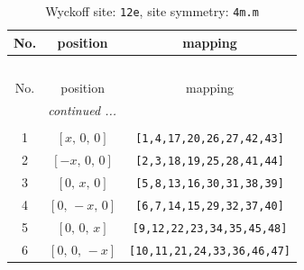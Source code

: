 \documentclass[fleqn,8pt]{jsarticle}
\begin{document}
\renewcommand{\arraystretch}{1.2}
\begin{longtable}{ccc}
\caption{Wyckoff site: {\tt 12e}, site symmetry: {\tt 4m.m}}
 \\
 \hline \hline
No. & position & mapping \\ \hline \endfirsthead

\multicolumn{2}{l}{\tablename\ \thetable{}} \\
 \hline \hline
No. & position & mapping \\ \hline \endhead

 \hline \hline
\multicolumn{2}{r}{\footnotesize\it continued ...} \\ \endfoot

 \hline \hline
\multicolumn{2}{r}{} \\ \endlastfoot

1 & $\left[ x,\, 0,\, 0 \right]$ & {\tt [1,4,17,20,26,27,42,43]} \\ \hline
2 & $\left[ - x,\, 0,\, 0 \right]$ & {\tt [2,3,18,19,25,28,41,44]} \\ \hline
3 & $\left[ 0,\, x,\, 0 \right]$ & {\tt [5,8,13,16,30,31,38,39]} \\ \hline
4 & $\left[ 0,\, - x,\, 0 \right]$ & {\tt [6,7,14,15,29,32,37,40]} \\ \hline
5 & $\left[ 0,\, 0,\, x \right]$ & {\tt [9,12,22,23,34,35,45,48]} \\ \hline
6 & $\left[ 0,\, 0,\, - x \right]$ & {\tt [10,11,21,24,33,36,46,47]} \\
\end{longtable}
\renewcommand{\arraystretch}{1.2}
\end{document}
